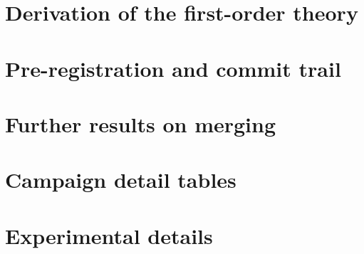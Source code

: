 \documentclass[a4paper,fleqn]{cas-sc}
\begin{document}



\appendix
\section{Derivation of the first-order theory}\label{app:theory}


\section{Pre-registration and commit trail}\label{app:prereg}


\section{Further results on merging}\label{app:merging}


\section{Campaign detail tables}\label{app:campaign}


\section{Experimental details}\label{app:details}


\end{document}
